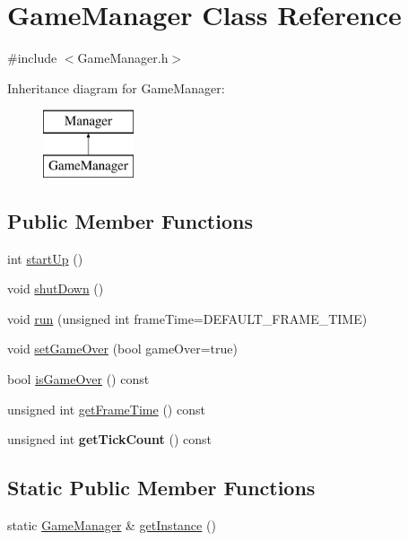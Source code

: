 \hypertarget{class_game_manager}{\section{Game\+Manager Class Reference}
\label{class_game_manager}
}


{\ttfamily \#include $<$Game\+Manager.\+h$>$}

Inheritance diagram for Game\+Manager\+:\begin{figure}[H]
\begin{center}
\leavevmode
\includegraphics[height=2.000000cm]{class_game_manager}
\end{center}
\end{figure}
\subsection*{Public Member Functions}
\begin{DoxyCompactItemize}
\item 
int \hyperlink{class_game_manager_a6626dd9f245039379b3416e2a28bb71c}{start\+Up} ()
\item 
void \hyperlink{class_game_manager_a6cbd6266472fb9c0b08a4c2f7f8813af}{shut\+Down} ()
\item 
void \hyperlink{class_game_manager_a3d5daf583c259edaf29c4b66ac20e480}{run} (unsigned int frame\+Time=D\+E\+F\+A\+U\+L\+T\+\_\+\+F\+R\+A\+M\+E\+\_\+\+T\+I\+M\+E)
\item 
void \hyperlink{class_game_manager_a18b1e6e63207f3fb71b4c3ce771bf704}{set\+Game\+Over} (bool game\+Over=true)
\item 
bool \hyperlink{class_game_manager_a5025aec4010d2c30631c0be20e94efee}{is\+Game\+Over} () const 
\item 
unsigned int \hyperlink{class_game_manager_a40be71508d2e97a080c6eb1acf5b8624}{get\+Frame\+Time} () const 
\item 
\hypertarget{class_game_manager_a821bef9440389f456a296a145ad30884}{unsigned int {\bfseries get\+Tick\+Count} () const }\label{class_game_manager_a821bef9440389f456a296a145ad30884}

\end{DoxyCompactItemize}
\subsection*{Static Public Member Functions}
\begin{DoxyCompactItemize}
\item 
static \hyperlink{class_game_manager}{Game\+Manager} \& \hyperlink{class_game_manager_a62c0bd2e38276cc3805fb38a85890d42}{get\+Instance} ()
\end{DoxyCompactItemize}


